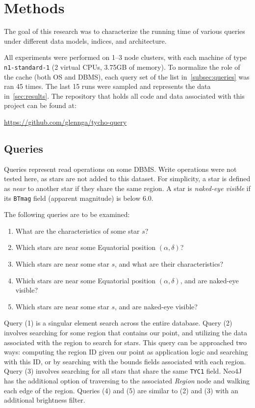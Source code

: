 \section{Methods}\label{sec:methods}
The goal of this research was to characterize the running time of various queries under different data models, indices,
and architecture.

All experiments were performed on 1--3 node clusters, with each machine of type \texttt{n1-standard-1} (2 virtual CPUs,
3.75GB of memory).
To normalize the role of the cache (both OS and DBMS), each query set of the list in~\autoref{subsec:queries} was ran
45 times.
The last 15 runs were sampled and represents the data in~\autoref{sec:results}.
The repository that holds all code and data associated with this project can be found at:

\url{https://github.com/glennga/tycho-query}

\subsection{Queries}\label{subsec:queries}
Queries represent read operations on some DBMS\@.
Write operations were not tested here, as stars are not added to this dataset.
For simplicity, a star is defined as \textit{near} to another star if they share the same region.
A star is \textit{naked-eye visible} if its \texttt{BTmag} field (apparent magnitude) is below 6.0.

The following queries are to be examined:
\begin{enumerate}
    \item What are the characteristics of some star $s$?
    \item Which stars are near some Equatorial position $(\alpha, \delta)$?
    \item Which stars are near some star $s$, and what are their characteristics?
    \item Which stars are near some Equatorial position $(\alpha, \delta)$, and are naked-eye visible?
    \item Which stars are near some star $s$, and are naked-eye visible?
\end{enumerate}

Query (1) is a singular element search across the entire database.
Query (2) involves searching for some region that contains our point, and utilizing the data associated with the
region to search for stars.
This query can be approached two ways: computing the region ID given our point as application logic and searching with
this ID, or by searching with the bounds fields associated with each region.
Query (3) involves searching for all stars that share the same \texttt{TYC1} field.
Neo4J has the additional option of traversing to the associated \textit{Region} node and walking each edge of the
region.
Queries (4) and (5) are similar to (2) and (3) with an additional brightness filter.


